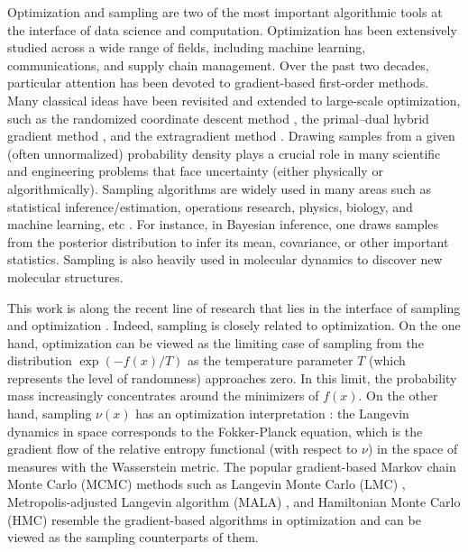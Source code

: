 \documentclass[11pt,letterpaper]{article}
\begin{document}
Optimization and sampling are two of the most important algorithmic tools at the interface of data science and computation. Optimization has been extensively studied across a wide range of fields, including machine learning, communications, and supply chain management. Over the past two decades, particular attention has been devoted to gradient-based first-order methods. Many classical ideas have been revisited and extended to large-scale optimization, such as the randomized coordinate descent method \cite{nesterov2012efficiency}, the primal–dual hybrid gradient method \cite{chambolle2011first}, and the extragradient method \cite{MR0451121}.
Drawing samples from a given (often unnormalized) probability density plays a crucial role in many scientific and engineering problems that face uncertainty (either physically or algorithmically). Sampling algorithms are widely used in many areas such as statistical inference/estimation, operations research, physics, biology, and machine learning, etc \cite{bertsimas2004solving,durmus2018efficient,dyer1991random,gelman2013bayesian,kalai2006simulated,kannan1997random,krauth2006statistical,sites2003delimiting}. For instance, in Bayesian inference, one draws samples from the posterior distribution to infer its mean, covariance, or other important statistics. Sampling is also heavily used in molecular dynamics to discover new molecular structures. 

This work is along the recent line of research that lies in the interface of sampling and optimization \cite{durmus2019analysis,salim2020primal}. Indeed, sampling is closely related to optimization.
On the one hand, optimization can be viewed as the limiting case of sampling from the distribution $\exp(-f(x)/T)$ as the temperature parameter $T$ (which represents the level of randomness) approaches zero. In this limit, the probability mass increasingly concentrates around the minimizers of $f(x)$.
On the other hand, sampling $\nu(x)$ has an optimization interpretation \cite{jordan1998variational,wibisono2018sampling,yang2020variational}:
the Langevin dynamics in space corresponds to the Fokker-Planck equation, which is the gradient flow
of the relative entropy functional (with respect to $\nu$) in the space of measures with the Wasserstein metric.
The popular gradient-based Markov chain Monte Carlo (MCMC) methods such as Langevin Monte Carlo (LMC) \cite{dalalyan2017theoretical,grenander1994representations,parisi1981correlation,roberts1996exponential}, Metropolis-adjusted Langevin algorithm (MALA) \cite{bou2013nonasymptotic,roberts2002langevin,roberts1996exponential}, and Hamiltonian Monte Carlo (HMC) \cite{neal2011mcmc} resemble the gradient-based algorithms in optimization and can be viewed as the sampling counterparts of them. 
\end{document}
